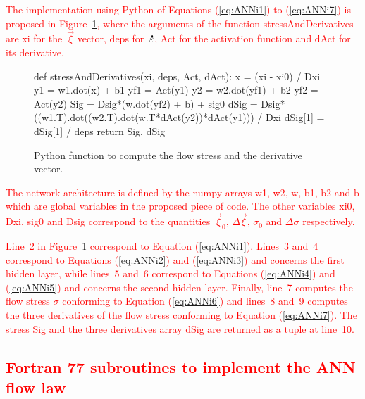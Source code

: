 \documentclass[algorithms,article,submit,pdftex,oneauthors]{Definitions/mdpi}
\DeclareRobustCommand{\mdot}[1]{\accentset{\mbox{\bfseries .}}{#1}}
\DeclareRobustCommand{\var}[1]{\textsf{#1}}
\begin{document}
\textcolor{red}{The implementation using Python of Equations (\ref{eq:ANNi1}) to (\ref{eq:ANNi7}) is proposed in Figure~\ref{fig:PythonStress}, where the arguments of the function \var{stressAndDerivatives} are \var{xi} for the~$\overrightarrow{\xi}$ vector, \var{deps} for~$\mdot{\varepsilon}$, \var{Act} for the activation function and \var{dAct} for its derivative.}
\begin{figure}[h!]
\begin{PythonListing}
def stressAndDerivatives(xi, deps, Act, dAct):
  x = (xi - xi0) / Dxi
  y1 = w1.dot(x) + b1
  yf1 = Act(y1)
  y2 = w2.dot(yf1) + b2
  yf2 = Act(y2)
  Sig = Dsig*(w.dot(yf2) + b) + sig0
  dSig = Dsig*((w1.T).dot((w2.T).dot(w.T*dAct(y2))*dAct(y1))) / Dxi
  dSig[1] = dSig[1] / deps
  return Sig, dSig
\end{PythonListing}
\caption{Python function to compute the flow stress and the derivative vector.\label{fig:PythonStress}}
\end{figure}
\textcolor{red}{The network architecture is defined by the numpy arrays \var{w1}, \var{w2}, \var{w}, \var{b1}, \var{b2} and \var{b} which are global variables in the proposed piece of code.
The other variables \var{xi0}, \var{Dxi}, \var{sig0} and \var{Dsig} correspond to the quantities~$\overrightarrow{\xi}_{0}$, $\Delta\overrightarrow{\xi}$, $\sigma_{0}$ and $\Delta\sigma$ respectively.}

\textcolor{red}{Line~2 in Figure~\ref{fig:PythonStress} correspond to Equation (\ref{eq:ANNi1}).
Lines~3 and~4 correspond to Equations (\ref{eq:ANNi2}) and (\ref{eq:ANNi3}) and concerns the first hidden layer, while lines~5 and~6 correspond to Equations (\ref{eq:ANNi4}) and (\ref{eq:ANNi5}) and concerns the second hidden layer.
Finally, line~7 computes the flow stress $\sigma$ conforming to Equation (\ref{eq:ANNi6}) and lines~8 and~9 computes the three derivatives of the flow stress conforming to Equation (\ref{eq:ANNi7}).
The stress \var{Sig} and the three derivatives array \var{dSig} are returned as a tuple at line~10.}

\textcolor{red}{\section[\appendixname~\thesection]{Fortran 77 subroutines to implement the ANN flow law\label{sec:Appendix2}}}
\end{document}
